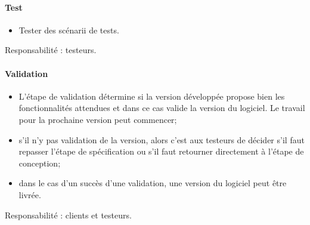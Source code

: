 \documentclass[a4paper,11pt,french]{article}
\begin{document}
\paragraph{Test}
\begin{itemize}
 \item Tester des scénarii de tests.
\end{itemize}
Responsabilité : testeurs.

\paragraph{Validation}
\begin{itemize}
 \item L'étape de validation détermine si la version développée propose bien les
fonctionnalités attendues et dans ce cas valide la version du logiciel.
Le travail pour la prochaine version peut commencer;
 \item s'il n'y pas validation de la version, alors c'est aux testeurs de
décider s'il faut repasser l'étape de spécification ou s'il faut retourner
directement à l'étape de conception;
 \item dans le cas d'un succès d'une validation, une version du logiciel peut 
être livrée.
\end{itemize}
Responsabilité : clients et testeurs.
\end{document}
